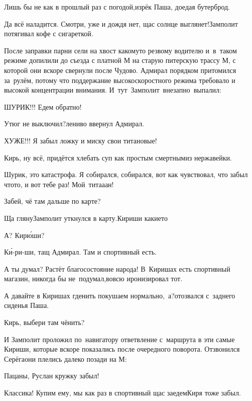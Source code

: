 \diagdash Лишь бы не как в прошлый раз с погодой,\mdash изрёк Паша, доедая бутерброд.

\diagdash Да всё наладится. Смотри, уже и дождя нет, щас солнце выглянет!\mdash Замполит потягивал кофе с сигареткой.

После заправки парни сели на хвост какому\sdash то резвому водителю и~в~таком режиме допилили до съезда с платной М на старую питерскую трассу М, с которой они вскоре свернули после Чудово. Адмирал порядком притомился за~рулём, потому что поддержание высокоскоростного режима требовало и высокой концентрации внимания. И~тут~Замполит~внезапно~выпалил:

\diagdash ШУРИК!!! Едем обратно!

\diagdash Утюг не выключил?\mdash лениво ввернул Адмирал.

\diagdash ХУЖЕ!!! Я забыл ложку и миску свои титановые!

\diagdash Кирь, ну всё, придётся хлебать суп как простым смертным\mdash из нержавейки.

\diagdash Шурик, это катастрофа. Я собирался, собирался, вот как чувствовал, что забыл что\sdash то, и вот тебе раз! Мой~тита\sdash а\sdash ан!

\diagdash Забей, чё там дальше по карте?

\diagdash Ща гляну\myldots{}\mdash Замполит уткнулся в карту.\mdash Кириши какие\sdash то\myldots{}

\diagdash А? Кир\'юши?

\diagdash К\'и-ри-ши, тащ Адмирал. Там и спортивный есть.

\diagdash А ты думал? Растёт благосостояние народа! В~Киришах есть спортивный магазин, никогда бы не~подумал,\mdash вовсю иронизировал тот.

\diagdash А давайте в Киришах где\sdash нить покушаем нормально,~а?\mdash отозвался с~заднего сиденья Паша.


\diagdash Кирь, выбери там чё\sdash нить?

И Замполит проложил по~навигатору ответвление с~маршрута в эти самые Кириши, которые вскоре показались после очередного поворота. Отзвонился Серёга\mdash они плелись далеко позади на М:

\diagdash Пацаны, Руслан кружку забыл!

\diagdash Классика! Купим ему, мы как раз в спортивный щас заедем\mdash Киря тоже забыл.

